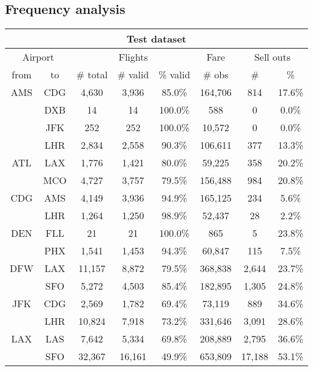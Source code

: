 \subsection{Frequency analysis}

\begin{center}
\footnotesize
\begin{tabular}{c c | c c c | c | c c}
\toprule
\multicolumn{8}{c}{\normalsize Test dataset} \\
\midrule
\multicolumn{2}{c|}{Airport}  & \multicolumn{3}{c|}{Flights} & Fare & \multicolumn{2}{c}{Sell outs} \\[.4ex]
from &  to  & \# total  & \# valid  & \% valid  &  \# obs  &  \#  &  \% \\
\midrule
AMS  &  CDG  &  4,630  &  3,936  &  85.0\%  &  164,706  &  814  &  17.6\% \\
~  &  DXB  &  14  &  14  &  100.0\%  &  588  &  0  &  0.0\% \\
~  &  JFK  &  252  &  252  &  100.0\%  &  10,572  &  0  &  0.0\% \\
~  &  LHR  &  2,834  &  2,558  &  90.3\%  &  106,611  &  377  &  13.3\% \\[.5ex]
ATL  &  LAX  &  1,776  &  1,421  &  80.0\%  &  59,225  &  358  &  20.2\% \\
~  &  MCO  &  4,727  &  3,757  &  79.5\%  &  156,488  &  984  &  20.8\% \\[.5ex]
CDG  &  AMS  &  4,149  &  3,936  &  94.9\%  &  165,125  &  234  &  5.6\% \\
~  &  LHR  &  1,264  &  1,250  &  98.9\%  &  52,437  &  28  &  2.2\% \\[.5ex]
DEN  &  FLL  &  21  &  21  &  100.0\%  &  865  &  5  &  23.8\% \\
~  &  PHX  &  1,541  &  1,453  &  94.3\%  &  60,847  &  115  &  7.5\% \\[.5ex]
DFW  &  LAX  &  11,157  &  8,872  &  79.5\%  &  368,838  &  2,644  &  23.7\% \\
~  &  SFO  &  5,272  &  4,503  &  85.4\%  &  182,895  &  1,305  &  24.8\% \\[.5ex]
JFK  &  CDG  &  2,569  &  1,782  &  69.4\%  &  73,119  &  889  &  34.6\% \\
~  &  LHR  &  10,824  &  7,918  &  73.2\%  &  331,646  &  3,091  &  28.6\% \\[.5ex]
LAX  &  LAS  &  7,642  &  5,334  &  69.8\%  &  208,889  &  2,795  &  36.6\% \\
~  &  SFO  &  32,367  &  16,161  &  49.9\%  &  653,809  &  17,188  &  53.1\% \\[.5ex]

\end{tabular}
\end{center}
